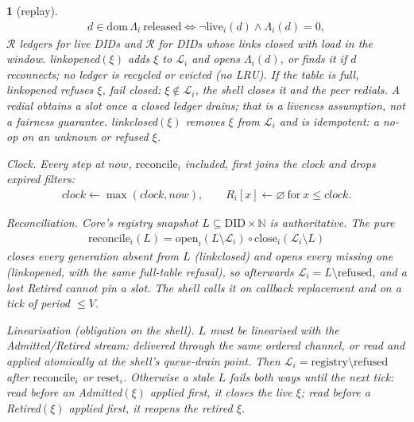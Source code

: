 \documentclass[journal]{IEEEtran}
\newcommand{\namedhead}{}
\newtheorem*{namedenv}{\namedhead}
\newenvironment{lawL}[2]{\renewcommand{\namedhead}{Law #1}%
  \begin{namedenv}[#2]}{\end{namedenv}}
\DeclareRobustCommand{\code}[1]{{\ttfamily\renewcommand{\_}{\textunderscore\allowbreak}#1}}
\begin{document}
\begin{lawL}{L9}{replay}
\begin{gather*}
d\in\mathrm{dom}\,\Lambda_i\ \text{released}\iff
\neg\mathrm{live}_i(d)\wedge\Lambda_i(d)=0,
\end{gather*}
$\mathcal R$ ledgers for live DIDs and $\mathcal R$ for DIDs whose links
closed with load in the window.  \code{link\_opened}$(\xi)$ adds $\xi$ to
$\mathcal L_i$ and opens $\Lambda_i(d)$, or finds it if $d$ reconnects; no
ledger is recycled or evicted (no LRU).  If the table is full,
\code{link\_opened} refuses $\xi$, fail closed: $\xi\notin\mathcal L_i$,
the shell closes it and the peer redials.  A redial obtains a slot once a
closed ledger drains; that is a liveness assumption, not a fairness
guarantee.  \code{link\_closed}$(\xi)$ removes $\xi$ from $\mathcal L_i$
and is idempotent: a no-op on an unknown or refused $\xi$.

\emph{Clock.}  Every step at $\mathit{now}$, $\mathrm{reconcile}_i$
included, first joins the clock and drops expired filters:
\begin{gather*}
\mathit{clock}\gets\max(\mathit{clock},\mathit{now}),\qquad
R_i[x]\gets\varnothing\ \text{for}\ x\le\mathit{clock}.
\end{gather*}

\emph{Reconciliation.}  Core's registry snapshot
$L\subseteq\mathrm{DID}\times\mathbb N$ is authoritative.  The pure
\begin{gather*}
\mathrm{reconcile}_i(L)=
\mathrm{open}_i(L\setminus\mathcal L_i)\circ
\mathrm{close}_i(\mathcal L_i\setminus L)
\end{gather*}
closes every generation absent from $L$ (\code{link\_closed}) and opens
every missing one (\code{link\_opened}, with the same full-table
refusal), so afterwards $\mathcal L_i=L\setminus\mathrm{refused}$, and a
lost \code{Retired} cannot pin a slot.  The shell calls it on callback
replacement and on a tick of period $\le V$.

\emph{Linearisation} (obligation on the shell).  $L$ must be
linearised with the \code{Admitted}/\code{Retired} stream: delivered
through the same ordered channel, or read and applied atomically at the
shell's queue-drain point.  Then
$\mathcal L_i=\mathrm{registry}\setminus\mathrm{refused}$ after
$\mathrm{reconcile}_i$ or $\mathrm{reset}_i$.  Otherwise a stale $L$
fails both ways until the next tick: read before an
\code{Admitted}$(\xi)$ applied first, it closes the live $\xi$; read
before a \code{Retired}$(\xi)$ applied first, it reopens the retired
$\xi$.


\end{lawL}
\end{document}

